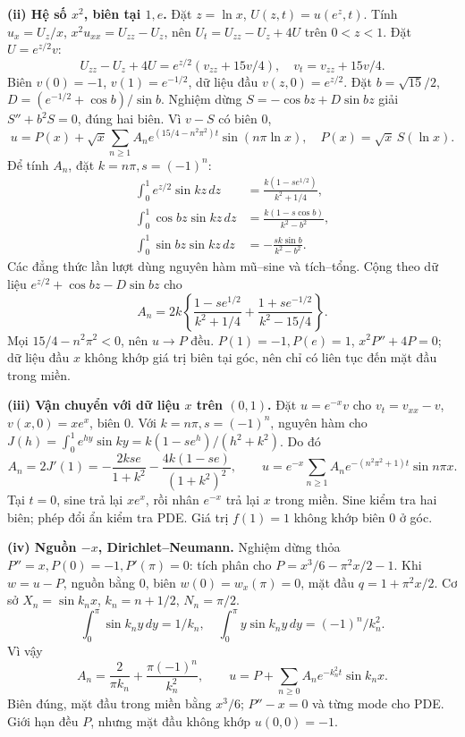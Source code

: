 \documentclass[10pt,a4paper]{article}
\begin{document}
\textbf{(ii) Hệ số $x^2$, biên tại $1,e$.}
Đặt $z=\ln x$, $U(z,t)=u(e^z,t)$. Tính $u_x=U_z/x$, $x^2u_{xx}=U_{zz}-U_z$, nên $U_t=U_{zz}-U_z+4U$ trên $0<z<1$. Đặt $U=e^{z/2}v$:
\[U_{zz}-U_z+4U=e^{z/2}(v_{zz}+15v/4),\quad v_t=v_{zz}+15v/4.\]
Biên $v(0)=-1$, $v(1)=e^{-1/2}$, dữ liệu đầu $v(z,0)=e^{z/2}$. Đặt $b=\sqrt{15}/2$, $D=(e^{-1/2}+\cos b)/\sin b$. Nghiệm dừng $S=-\cos bz+D\sin bz$ giải $S''+b^2S=0$, đúng hai biên. Vì $v-S$ có biên $0$,
\[u=P(x)+\sqrt x\sum_{n\ge1}A_ne^{(15/4-n^2\pi^2)t}\sin(n\pi\ln x),\quad
P(x)=\sqrt x\,S(\ln x).\]
Để tính $A_n$, đặt $k=n\pi,s=(-1)^n$:
\begin{align*}
\int_0^1e^{z/2}\sin kz\,dz&=\frac{k(1-se^{1/2})}{k^2+1/4},\\
\int_0^1\cos bz\sin kz\,dz&=\frac{k(1-s\cos b)}{k^2-b^2},\\
\int_0^1\sin bz\sin kz\,dz&=-\frac{sk\sin b}{k^2-b^2}.
\end{align*}
Các đẳng thức lần lượt dùng nguyên hàm mũ–sine và tích–tổng. Cộng theo dữ liệu $e^{z/2}+\cos bz-D\sin bz$ cho
\[A_n=2k\left\{\frac{1-se^{1/2}}{k^2+1/4}
+\frac{1+se^{-1/2}}{k^2-15/4}\right\}.\]
Mọi $15/4-n^2\pi^2<0$, nên $u\to P$ đều. $P(1)=-1,P(e)=1$, $x^2P''+4P=0$; dữ liệu đầu $x$ không khớp giá trị biên tại góc, nên chỉ có liên tục đến mặt đầu trong miền.

\textbf{(iii) Vận chuyển với dữ liệu $x$ trên $(0,1)$.}
Đặt $u=e^{-x}v$ cho $v_t=v_{xx}-v$, $v(x,0)=xe^x$, biên $0$. Với $k=n\pi,s=(-1)^n$, nguyên hàm cho $J(h)=\int_0^1e^{hy}\sin ky=k(1-se^h)/(h^2+k^2)$. Do đó
\[A_n=2J'(1)=-\frac{2kse}{1+k^2}-\frac{4k(1-se)}{(1+k^2)^2},\qquad
u=e^{-x}\sum_{n\ge1}A_ne^{-(n^2\pi^2+1)t}\sin n\pi x.\]
Tại $t=0$, sine trả lại $xe^x$, rồi nhân $e^{-x}$ trả lại $x$ trong miền. Sine kiểm tra hai biên; phép đổi ẩn kiểm tra PDE. Giá trị $f(1)=1$ không khớp biên $0$ ở góc.

\textbf{(iv) Nguồn $-x$, Dirichlet–Neumann.}
Nghiệm dừng thỏa $P''=x,P(0)=-1,P'(\pi)=0$: tích phân cho $P=x^3/6-\pi^2x/2-1$. Khi $w=u-P$, nguồn bằng $0$, biên $w(0)=w_x(\pi)=0$, mặt đầu $q=1+\pi^2x/2$. Cơ sở $X_n=\sin k_nx$, $k_n=n+1/2$, $N_n=\pi/2$.
\[\int_0^\pi\sin k_ny\,dy=1/k_n,\quad
\int_0^\pi y\sin k_ny\,dy=(-1)^n/k_n^2.\]
Vì vậy
\[A_n=\frac2{\pi k_n}+\frac{\pi(-1)^n}{k_n^2},\qquad
u=P+\sum_{n\ge0}A_ne^{-k_n^2t}\sin k_nx.\]
Biên đúng, mặt đầu trong miền bằng $x^3/6$; $P''-x=0$ và từng mode cho PDE. Giới hạn đều $P$, nhưng mặt đầu không khớp $u(0,0)=-1$.
\end{document}
